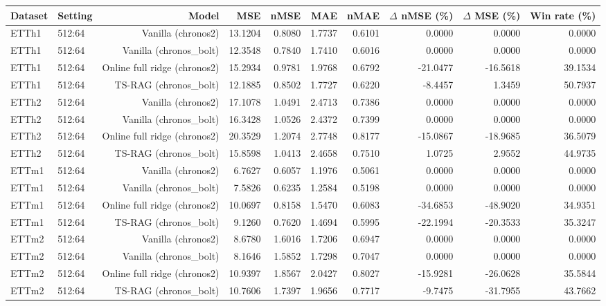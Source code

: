 \begin{tabular}{llrrrrrrrr}
\toprule
Dataset & Setting & Model & MSE & nMSE & MAE & nMAE & $\Delta$ nMSE (\%) & $\Delta$ MSE (\%) & Win rate (\%) \\
\midrule
ETTh1 & 512:64 & Vanilla (chronos2) & 13.1204 & 0.8080 & 1.7737 & 0.6101 & 0.0000 & 0.0000 & 0.0000 \\
ETTh1 & 512:64 & Vanilla (chronos\_bolt) & 12.3548 & 0.7840 & 1.7410 & 0.6016 & 0.0000 & 0.0000 & 0.0000 \\
ETTh1 & 512:64 & Online full ridge (chronos2) & 15.2934 & 0.9781 & 1.9768 & 0.6792 & -21.0477 & -16.5618 & 39.1534 \\
ETTh1 & 512:64 & TS-RAG (chronos\_bolt) & 12.1885 & 0.8502 & 1.7727 & 0.6220 & -8.4457 & 1.3459 & 50.7937 \\
ETTh2 & 512:64 & Vanilla (chronos2) & 17.1078 & 1.0491 & 2.4713 & 0.7386 & 0.0000 & 0.0000 & 0.0000 \\
ETTh2 & 512:64 & Vanilla (chronos\_bolt) & 16.3428 & 1.0526 & 2.4372 & 0.7399 & 0.0000 & 0.0000 & 0.0000 \\
ETTh2 & 512:64 & Online full ridge (chronos2) & 20.3529 & 1.2074 & 2.7748 & 0.8177 & -15.0867 & -18.9685 & 36.5079 \\
ETTh2 & 512:64 & TS-RAG (chronos\_bolt) & 15.8598 & 1.0413 & 2.4658 & 0.7510 & 1.0725 & 2.9552 & 44.9735 \\
ETTm1 & 512:64 & Vanilla (chronos2) & 6.7627 & 0.6057 & 1.1976 & 0.5061 & 0.0000 & 0.0000 & 0.0000 \\
ETTm1 & 512:64 & Vanilla (chronos\_bolt) & 7.5826 & 0.6235 & 1.2584 & 0.5198 & 0.0000 & 0.0000 & 0.0000 \\
ETTm1 & 512:64 & Online full ridge (chronos2) & 10.0697 & 0.8158 & 1.5470 & 0.6083 & -34.6853 & -48.9020 & 34.9351 \\
ETTm1 & 512:64 & TS-RAG (chronos\_bolt) & 9.1260 & 0.7620 & 1.4694 & 0.5995 & -22.1994 & -20.3533 & 35.3247 \\
ETTm2 & 512:64 & Vanilla (chronos2) & 8.6780 & 1.6016 & 1.7206 & 0.6947 & 0.0000 & 0.0000 & 0.0000 \\
ETTm2 & 512:64 & Vanilla (chronos\_bolt) & 8.1646 & 1.5852 & 1.7298 & 0.7047 & 0.0000 & 0.0000 & 0.0000 \\
ETTm2 & 512:64 & Online full ridge (chronos2) & 10.9397 & 1.8567 & 2.0427 & 0.8027 & -15.9281 & -26.0628 & 35.5844 \\
ETTm2 & 512:64 & TS-RAG (chronos\_bolt) & 10.7606 & 1.7397 & 1.9656 & 0.7717 & -9.7475 & -31.7955 & 43.7662 \\

\end{tabular}
